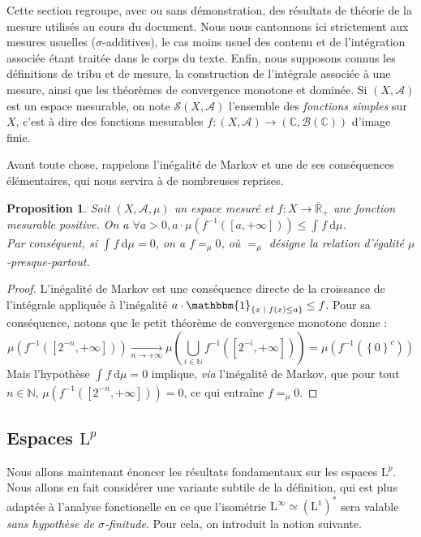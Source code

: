 \documentclass[a4paper,12pt]{article}
\newtheorem{proposition}[theorem]{Proposition}
\newcommand{\R}{\mathbb{R}}
\newcommand{\N}{\mathbb{N}}
\newcommand{\C}{\mathbb{C}}
\newcommand{\Bor}{\mathcal{B}}
\newcommand{\set}[1]{\left\{ #1 \right\}}
\newcommand{\indic}{\mathbbm{1}}
\newcommand{\integral}[4]{\int_{#1}^{#2} #3~\mathrm{d}#4}
\newcommand{\tq}{\;\middle|\;}
\newcommand{\inv}{^{-1}}
\newcommand{\compl}{^c}
\begin{document}
Cette section regroupe, avec ou sans démonstration, des résultats de théorie de la mesure utilisés au cours du document.
Nous nous cantonnons ici strictement aux mesures usuelles ($\sigma$-additives), le cas moins usuel des contenu et de 
l'intégration associée étant traitée dans le corps du texte. Enfin, nous supposons connus les définitions de tribu et de mesure,
la construction de l'intégrale associée à une mesure, ainsi que les théorèmes de convergence monotone et dominée.
Si $(X, \mathcal{A})$ est un espace mesurable, on note $\mathscr{S}(X, \mathcal{A})$ l'ensemble des \emph{fonctions simples}
sur $X$, c'est à dire des fonctions mesurables $f : (X, \mathcal{A})\to(\C, \Bor(\C))$ d'image finie. 

Avant toute chose, rappelons l'inégalité de Markov et une de ses conséquences élémentaires, qui nous servira à de nombreuses reprises.
\begin{proposition}\label{markov_and_consequence}
    Soit $(X, \mathcal{A}, \mu)$ un espace mesuré et $f:X\to\overline{\R}_+$ une fonction mesurable positive.
    On a $\forall a>0, a\cdot\mu\left(f\inv([a, +\infty])\right) \le \integral{}{}{f}{\mu}$. \\
    Par conséquent, si $\integral{}{}{f}{\mu} = 0$, on a $f =_\mu 0$, où $=_\mu$ désigne la relation 
    d'égalité $\mu$-presque-partout.
\end{proposition}

\begin{proof}
    L'inégalité de Markov est une conséquence directe de la croissance de l'intégrale appliquée à 
    l'inégalité $a\cdot\indic_{\set{x\tq f(x)\le a}} \le f$. Pour sa conséquence, notons que le petit théorème de convergence monotone donne :
    \begin{equation*}
        \mu(f\inv([2^{-n}, +\infty])) \xrightarrow[n\to+\infty]{} \mu\left(\bigcup_{i\in\N} f\inv([2^{-i}, +\infty])\right) = \mu(f\inv(\set{0}\compl))
    \end{equation*}
    Mais l'hypothèse $\integral{}{}{f}{\mu} = 0$ implique, \emph{via} l'inégalité de Markov, que pour tout $n\in\N$, $\mu(f\inv([2^{-n}, +\infty]))=0$,
    ce qui entraîne $f =_\mu 0$.
\end{proof}

\subsection*{Espaces \texorpdfstring{$\mathrm{L}^p$}{L\textsuperscript{p}}}

Nous allons maintenant énoncer les résultats fondamentaux sur les espaces $\mathrm{L}^p$. Nous allons en fait considérer une variante subtile de 
la définition, qui est plus adaptée à l'analyse fonctionelle en ce que l'isométrie $\mathrm{L}^\infty \simeq (\mathrm{L}^1)^*$
sera valable \emph{sans hypothèse de $\sigma$-finitude}. Pour cela, on introduit la notion suivante.
\end{document}
